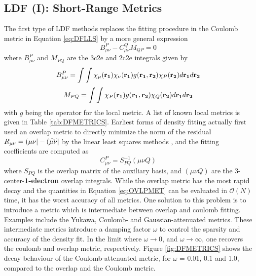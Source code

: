 \subsection{LDF (I): Short-Range Metrics}
The first type of LDF methods replaces the fitting procedure in the Coulomb metric in Equation \ref{eq:DFLLS} by a more general expression
\begin{equation}
B_{\mu\nu}^{P} - C_{\mu\nu}^{Q} M_{QP} = 0
\end{equation}  
\noindent where $B_{\mu\nu}^{P}$ and $M_{PQ}$ are the 3c2e and 2c2e integrals given by
\begin{equation}
B_{\mu\nu}^P = \int\int \chi_{\mu}(\mathbf{r_{1}})\chi_{\nu}(\mathbf{r_{1}}) g(\mathbf{r_1},\mathbf{r_2}) \chi_{P}(\mathbf{r_{2}}) d\mathbf{r_1} d\mathbf{r_2}
\end{equation}
\begin{equation}
M_{PQ} = \int\int \chi_{P}(\mathbf{r_{1}}) g(\mathbf{r_1},\mathbf{r_2}) \chi_{Q}(\mathbf{r_{2}}) d\mathbf{r_1} d\mathbf{r_2}
\end{equation}
\noindent with $g$ being the operator for the local metric. A list of known local metrics is given in Table \ref{tab:DFMETRICS}. Earliest forms of density fitting actually first used an overlap metric to directly minimize the norm of the residual $R_{\mu\nu} = \left( \mu\nu \right\rvert - \left( \widetilde{\mu\nu} \right\rvert$ by the linear least squares methods \cite{Bae1973}, and the fitting coefficients are computed as
\begin{equation}
C^P_{\mu\nu} = S_{PQ}^{-1} (\mu\nu Q)
\label{eq:OVLPMET}
\end{equation}
\noindent where $S_{PQ}$ is the overlap matrix of the auxiliary basis, and $(\mu\nu Q)$ are the 3-center-\textbf{1-electron} overlap integrals. While the overlap metric has the most rapid decay and the quantities in Equation \ref{eq:OVLPMET} can be evaluated in $\mathcal{O}(N)$ time, it has the worst accuracy of all metrics. One solution to this problem is to introduce a metric which is intermediate between overlap and coulomb fitting. Examples include the Yukawa, Coulomb- and Gaussian-attenuated metrics. These intermediate metrics introduce a damping factor $\omega$ to control the sparsity and accuracy of the density fit. In the limit where $\omega \rightarrow 0$, and $\omega \rightarrow \infty$, one recovers the coulomb and overlap metric, respectively. Figure \ref{fig:DFMETRICS} shows the decay behaviour of the Coulomb-attenuated metric, for $\omega$ = 0.01, 0.1 and 1.0, compared to the overlap and the Coulomb metric. 


